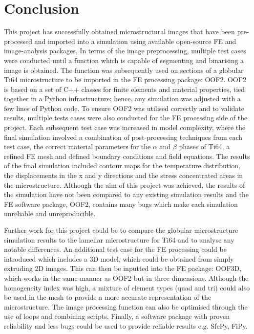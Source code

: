 \documentclass[report.tex]{subfiles}
\begin{document}
\section{Conclusion}

\noindent This project has successfully obtained microstructural images that have been pre-processed and imported into a simulation using available open-source FE and image-analysis packages. In terms of the image preprocessing, multiple test cases were conducted until a function which is capable of segmenting and binarising a image is obtained. The function was subsequently used on sections of a globular Ti64 microstructure to be imported in the FE processing package: OOF2. OOF2 is based on a set of C++ classes for finite elements and material properties, tied together in a Python infrastructure; hence, any simulation was adjusted with a few lines of Python code. To ensure OOF2 was utilised correctly and to validate results, multiple tests cases were also conducted for the FE processing side of the project. Each subsequent test case was increased in model complexity, where the final simulation involved a combination of post-processing techniques from each test case, the correct material parameters for the $\alpha$ and $\beta$ phases of Ti64, a refined FE mesh and defined boundary conditions and  field equations. The results of the final simulation included contour maps for the temperature distribution, the displacements in the x and y directions and the stress concentrated areas in the microstructure. Although the aim of this  project was achieved, the results of the simulation have not been compared to any existing simulation results and the FE software package, OOF2, contains many bugs which make each simulation unreliable and unreproducible. \newline
 
\noindent Further work for this project could be to compare the globular microstructure simulation results to the lamellar microstructure for Ti64 and to analyse any notable differences. An additional test case for the FE processing could be introduced which includes a 3D model, which could be obtained from simply extruding 2D images. This can then be inputted into the FE package: OOF3D, which works in the same manner as OOF2 but in three dimensions. Although the homogeneity index was high, a mixture of element types (quad and tri) could also be used in the mesh to provide a more accurate representation of the microstructure. The image processing function can also be optimised through the use of loops and combining scripts. Finally, a software package with proven reliability and less bugs could be used to provide reliable results e.g. SfePy, FiPy.
 
\end{document}
